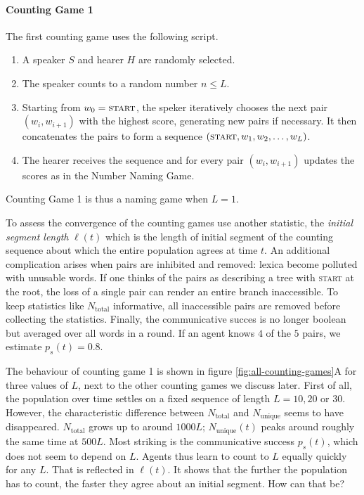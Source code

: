 \documentclass{../src/bcthesispart}
\begin{document}
\paragraph{Counting Game 1}
The first counting game uses the following script.
\begin{enumerate}
	\item A speaker $S$ and hearer $H$ are randomly selected.
	\item The speaker counts to a random number $n \le L$. 
	\item Starting from $w_0 = \textsc{start}$, the speker iteratively chooses the next pair $(w_i, w_{i+1})$ with the highest score, generating new pairs if necessary. It then concatenates the pairs to form a sequence $(\textsc{start}, w_1, w_2, \dots, w_L)$. 
	\item The hearer receives the sequence and for every pair $(w_i, w_{i+1})$ updates the scores as in the Number Naming Game.
\end{enumerate}
Counting Game 1 is thus a naming game when $L=1$.

To assess the convergence of the counting games use another statistic, the \emph{initial segment length} $\ell(t)$ which is the length of initial segment of the counting sequence about which the entire population agrees at time $t$.
An additional complication arises when pairs are inhibited and removed:  lexica become polluted with unusable words. 
If one thinks of the pairs as describing a tree with \textsc{start} at the root, the loss of a single pair can render an entire branch inaccessible.
To keep statistics like $N_{\text{total}}$ informative, all inaccessible pairs are removed before collecting the statistics.
Finally, the communicative succes is no longer boolean but averaged over all words in a round.
If an agent knows $4$ of the $5$ pairs, we estimate $p_s(t) = 0.8$.


The behaviour of counting game 1 is shown in figure \ref{fig:all-counting-games}A for three values of $L$, next to the other counting games we discuss later.
First of all, the population over time settles on a fixed sequence of length $L=10, 20$ or $30$.
However, the characteristic difference between $N_{\text{total}}$ and $N_{\text{unique}}$ seems to have disappeared.
$N_{\text{total}}$ grows up to around $1000 L$; $N_{\text{unique}}(t)$ peaks around roughly the same time at $500 L$.
Most striking is the communicative success $p_s(t)$, which does not seem to depend on $L$.
Agents thus learn to count to $L$ equally quickly for any $L$.
That is reflected in $\ell(t)$.
It shows that the further the population has to count, the faster they agree about an initial segment. 
How can that be?
\end{document}
